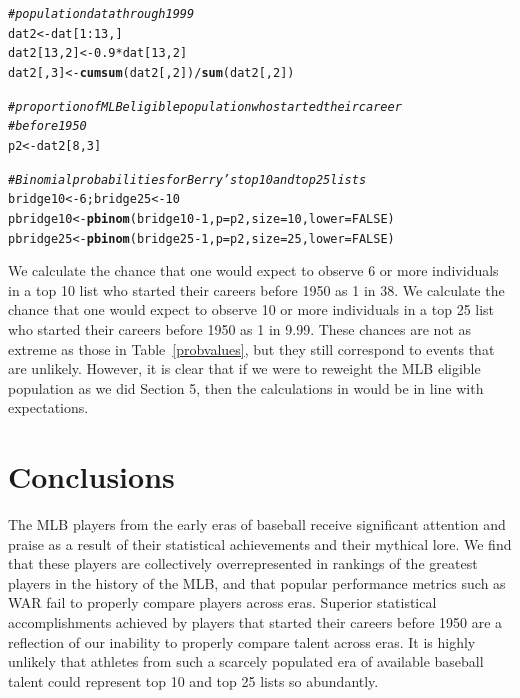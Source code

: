 \documentclass[11pt]{article}\usepackage[]{graphicx}\usepackage[]{color}
\makeatletter
\newcommand{\hlnum}[1]{\textcolor[rgb]{0.686,0.059,0.569}{#1}}%
\newcommand{\hlcom}[1]{\textcolor[rgb]{0.678,0.584,0.686}{\textit{#1}}}%
\newcommand{\hlopt}[1]{\textcolor[rgb]{0,0,0}{#1}}%
\newcommand{\hlstd}[1]{\textcolor[rgb]{0.345,0.345,0.345}{#1}}%
\newcommand{\hlkwb}[1]{\textcolor[rgb]{0.69,0.353,0.396}{#1}}%
\newcommand{\hlkwc}[1]{\textcolor[rgb]{0.333,0.667,0.333}{#1}}%
\newcommand{\hlkwd}[1]{\textcolor[rgb]{0.737,0.353,0.396}{\textbf{#1}}}%
\newenvironment{kframe}{%
 \def\at@end@of@kframe{}%
 \ifinner\ifhmode%
  \def\at@end@of@kframe{\end{minipage}}%
  \begin{minipage}{\columnwidth}%
 \fi\fi%
 \def\FrameCommand##1{\hskip\@totalleftmargin \hskip-\fboxsep
 \colorbox{shadecolor}{##1}\hskip-\fboxsep
     \hskip-\linewidth \hskip-\@totalleftmargin \hskip\columnwidth}%
 \MakeFramed {\advance\hsize-\width
   \@totalleftmargin\z@ \linewidth\hsize
   \@setminipage}}%
 {\par\unskip\endMakeFramed%
 \at@end@of@kframe}
\newenvironment{knitrout}{}{} %
\makeatother
\begin{document}
\begin{knitrout}
\color{fgcolor}\begin{kframe}
\begin{alltt}
\hlcom{# population data through 1999}
\hlstd{dat2} \hlkwb{<-} \hlstd{dat[}\hlnum{1}\hlopt{:}\hlnum{13}\hlstd{, ]}
\hlstd{dat2[}\hlnum{13}\hlstd{,} \hlnum{2}\hlstd{]} \hlkwb{<-} \hlnum{0.9} \hlopt{*} \hlstd{dat[}\hlnum{13}\hlstd{,} \hlnum{2}\hlstd{]}
\hlstd{dat2[,} \hlnum{3}\hlstd{]} \hlkwb{<-} \hlkwd{cumsum}\hlstd{(dat2[,} \hlnum{2}\hlstd{])} \hlopt{/} \hlkwd{sum}\hlstd{(dat2[,} \hlnum{2}\hlstd{])}

\hlcom{# proportion of MLB eligible population who started their career }
\hlcom{# before 1950}
\hlstd{p2} \hlkwb{<-} \hlstd{dat2[}\hlnum{8}\hlstd{,} \hlnum{3}\hlstd{]}

\hlcom{# Binomial probabilities for Berry's top 10 and top 25 lists}
\hlstd{bridge10} \hlkwb{<-} \hlnum{6}\hlstd{; bridge25} \hlkwb{<-} \hlnum{10}
\hlstd{pbridge10} \hlkwb{<-} \hlkwd{pbinom}\hlstd{(bridge10} \hlopt{-} \hlnum{1}\hlstd{,} \hlkwc{p} \hlstd{= p2,} \hlkwc{size} \hlstd{=} \hlnum{10}\hlstd{,} \hlkwc{lower} \hlstd{=} \hlnum{FALSE}\hlstd{)}
\hlstd{pbridge25} \hlkwb{<-} \hlkwd{pbinom}\hlstd{(bridge25} \hlopt{-} \hlnum{1}\hlstd{,} \hlkwc{p} \hlstd{= p2,} \hlkwc{size} \hlstd{=} \hlnum{25}\hlstd{,} \hlkwc{lower} \hlstd{=} \hlnum{FALSE}\hlstd{)}
\end{alltt}
\end{kframe}
\end{knitrout}

We calculate the chance that one would expect to 
observe 6 or more individuals in a top 10 list who started their careers 
before 1950 as 1 in 38. 
We calculate the chance that one would expect to observe 10 or more 
individuals in a top 25 list who started their careers before 1950 as 
1 in 9.99.  These chances are not as extreme 
as those in Table~\ref{probvalues}, but they still correspond to events 
that are unlikely.  However, it is clear that if we were to reweight the 
MLB eligible population as we did Section 5, then the calculations in 
\citet{berry1999eras} would be in line with expectations.




\section{Conclusions}

The MLB players from the early eras of baseball receive significant attention 
and praise as a result of their statistical achievements and their mythical 
lore.  We find that these players are collectively overrepresented in 
rankings of the greatest players in the history of the MLB, and that popular 
performance metrics such as WAR fail to properly compare players across eras.  
Superior statistical accomplishments achieved 
by players that started their careers before 1950 are a reflection of our 
inability to properly compare talent across eras.  It is highly unlikely that 
athletes from such a scarcely populated era of available baseball talent 
could represent top 10 and top 25 lists so abundantly. 
\end{document}
